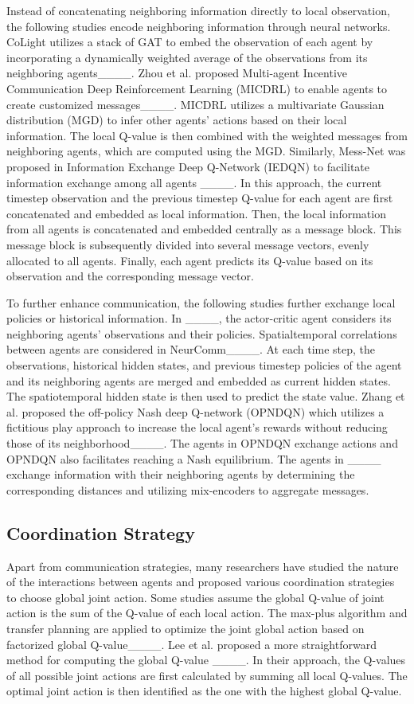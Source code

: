 Instead of concatenating neighboring information directly to local observation, the following studies encode neighboring information through neural networks.  
CoLight utilizes a stack of GAT to embed the observation of each agent by incorporating a dynamically weighted average of the observations from its neighboring agents____. 
Zhou et al. proposed Multi-agent Incentive Communication Deep Reinforcement Learning (MICDRL) to enable agents to create customized messages____. MICDRL utilizes a multivariate Gaussian distribution (MGD) to infer other agents' actions based on their local information. The local Q-value is then combined with the weighted messages from neighboring agents, which are computed using the MGD.
Similarly, Mess-Net was proposed in Information Exchange Deep Q-Network (IEDQN) to facilitate information exchange among all agents ____. In this approach, the current timestep observation and the previous timestep Q-value for each agent are first concatenated and embedded as local information. Then, the local information from all agents is concatenated and embedded centrally as a message block. This message block is subsequently divided into several message vectors, evenly allocated to all agents. Finally, each agent predicts its Q-value based on its observation and the corresponding message vector.

To further enhance communication, the following studies further exchange local policies or historical information.
In ____, the actor-critic agent considers its neighboring agents' observations and their policies.
Spatialtemporal correlations between agents are considered in NeurComm____. At each time step, the observations, historical hidden states, and previous timestep policies of the agent and its neighboring agents are merged and embedded as current hidden states. The spatiotemporal hidden state is then used to predict the state value.
Zhang et al. proposed the off-policy Nash deep Q-network (OPNDQN) which utilizes a fictitious play approach to increase the local agent's rewards without reducing those of its neighborhood____. The agents in OPNDQN exchange actions and OPNDQN also facilitates reaching a Nash equilibrium.
The agents in ____ exchange information with their neighboring agents by determining the corresponding distances and utilizing mix-encoders to aggregate messages. 

\subsection{Coordination Strategy}
Apart from communication strategies, many researchers have studied the nature of the interactions between agents and proposed various coordination strategies to choose global joint action. Some studies assume the global Q-value of joint action is the sum of the Q-value of each local action.
The max-plus algorithm and transfer planning are applied to optimize the joint global action based on factorized global Q-value____.
Lee et al. proposed a more straightforward method for computing the global Q-value ____. In their approach, the Q-values of all possible joint actions are first calculated by summing all local Q-values. The optimal joint action is then identified as the one with the highest global Q-value.

